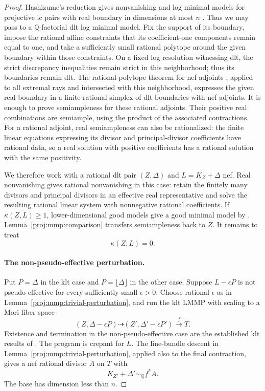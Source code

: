 \documentclass[11pt,letterpaper]{article}
\theoremstyle{definition}
\theoremstyle{remark}
\begin{document}
\begin{proof}
Hashizume's reduction gives nonvanishing and log minimal models
for projective lc pairs with real boundary in dimensions at most
\(n\) \cite[Theorem~1.4]{Proj-Hashizume2018}.
Thus we may pass to a \(\mathbb{Q}\)-factorial dlt log minimal model.
Fix the support of its boundary, impose the rational affine
constraints that its coefficient-one components remain equal
to one, and take a sufficiently small rational polytope around
the given boundary within those constraints. On a fixed log
resolution witnessing dlt, the strict discrepancy inequalities
remain strict in this neighborhood; thus its boundaries remain
dlt. The rational-polytope theorem for nef adjoints
\cite[Remark~3.1 and Proposition~3.2(3)]{Proj-Birkar2011II}, applied
to all extremal rays and intersected with this neighborhood,
expresses the given real boundary in a finite rational simplex
of dlt boundaries with nef adjoints.
It is enough to prove semiampleness for these
rational adjoints. Their positive real combinations are
semiample, using the product of the associated contractions.
For a rational adjoint, real semiampleness can also be
rationalized: the finite linear equations expressing its
divisor and principal-divisor coefficients have rational data,
so a real solution with positive coefficients has a rational
solution with the same positivity.

We therefore work with a rational dlt pair \((Z,\Delta)\) and
\(L=K_Z+\Delta\) nef.
Real nonvanishing gives rational nonvanishing in this case:
retain the finitely many divisors and principal divisors in
an effective real representative and solve the resulting
rational linear system with nonnegative rational coefficients.
If \(\kappa(Z,L)\geq 1\), lower-dimensional good models give a
good minimal model by \cite[Lemma~3.5]{Proj-FujinoGongyoRings2014}.
Lemma~\ref{proj:mmp:comparison} transfers semiampleness back to \(Z\).
It remains to treat
\[
 \kappa(Z,L)=0.
\]

\paragraph{The non-pseudo-effective perturbation.}
Put \(P=\Delta\) in the klt case and
\(P=\lfloor\Delta\rfloor\) in the other case.
Suppose \(L-\epsilon P\) is not pseudo-effective for every
sufficiently small \(\epsilon>0\).
Choose rational \(\epsilon\) as in
Lemma~\ref{proj:mmp:trivial-perturbation}, and run the klt LMMP
with scaling to a Mori fiber space
\[
 (Z,\Delta-\epsilon P)\dashrightarrow
 (Z',\Delta'-\epsilon P')\xrightarrow{f} T.
\]
Existence and termination in the non-pseudo-effective case are
the established klt results of \cite{BCHM}.
The program is crepant for \(L\).
The line-bundle descent in
Lemma~\ref{proj:mmp:trivial-perturbation}, applied also to the final
contraction, gives a nef rational divisor \(A\) on \(T\) with
\[
 K_{Z'}+\Delta'\sim_{\mathbb{Q}}f^*A.
\]
The base has dimension less than \(n\).


\end{proof}
\end{document}

